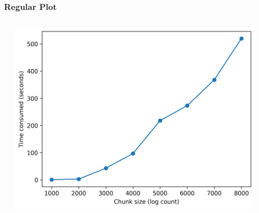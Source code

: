 \documentclass[xcolor={svgnames}]{beamer}
\newcommand{\pyfile}[2][]{}
\begin{document}
\begin{frame}[t,fragile]
    \frametitle{Regular Plot}
    \vspace{-2mm}
    \begin{columns}[T]
        \begin{column}{0.49\textwidth}
            \pyfile[style=footnotesize]{examples/xkcd-0.py}
        \end{column}
        \begin{column}{0.51\textwidth}
            \includegraphics[width=\textwidth]{img/xkcd-0.png}
        \end{column}
    \end{columns}
\end{frame}
\end{document}

